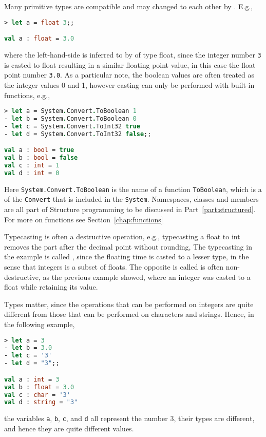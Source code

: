 Many primitive types are compatible and may changed to each other by . E.g.,
\begin{lstlisting}[language=fsharp,caption={fsharpi}]
> let a = float 3;;

val a : float = 3.0
\end{lstlisting}
where the left-hand-side is inferred to by of type float, since the integer number \verb|3| is casted to float resulting in a similar floating point value, in this case the float point number \verb|3.0|. As a particular note, the boolean values are often treated as the integer values 0 and 1, however casting can only be performed with built-in functions, e.g., \begin{lstlisting}[language=fsharp,caption={fsharpi}]
> let a = System.Convert.ToBoolean 1    
- let b = System.Convert.ToBoolean 0    
- let c = System.Convert.ToInt32 true   
- let d = System.Convert.ToInt32 false;;

val a : bool = true
val b : bool = false
val c : int = 1
val d : int = 0
\end{lstlisting}
Here \verb|System.Convert.ToBoolean| is the name of a function \verb|ToBoolean|, which is a  of the  \verb|Convert| that is included in the  \verb|System|. Namespaces, classes and members are all part of Structure programming to be discussed in Part~\ref{part:structured}. For more on functions see Section~\ref{chap:functions}

Typecasting is often a destructive operation, e.g., typecasting a float to int removes the part after the decimal point without rounding,
%
%
The typecasting in the example is called , since the floating time is casted to a lesser type, in the sense that integers is a subset of floats. The opposite is called  is often non-destructive, as the previous example showed, where an integer was casted to a float while retaining its value.
 
Types matter, since the operations that can be performed on integers are quite different from those that can be performed on characters and strings. Hence, in the following example,
\begin{lstlisting}[language=fsharp,caption={fsharpi}]
> let a = 3
- let b = 3.0 
- let c = '3' 
- let d = "3";;

val a : int = 3
val b : float = 3.0
val c : char = '3'
val d : string = "3"
\end{lstlisting}
the variables \verb|a|, \verb|b|, \verb|c|, and \verb|d| all represent the number 3, their types are different, and hence they are quite different values.

